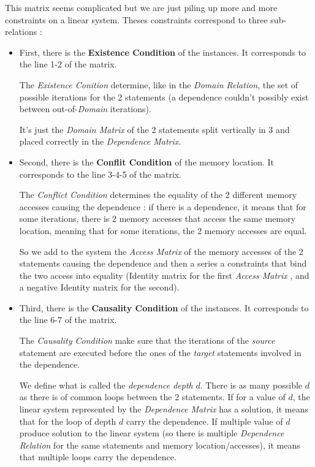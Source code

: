 \documentclass[paper=a4, fontsize=11pt]{scrartcl}
\numberwithin{equation}{section}        %
\numberwithin{figure}{section}          %
\numberwithin{table}{section}               %
\begin{document}
        This matrix seems complicated but we are just piling up more and more constraints
        on a linear system. Theses constraints correspond to three sub-relations :
        \begin{itemize}
            \item First, there is the \textbf{Existence Condition} of the instances.
                It corresponds to the line 1-2 of the matrix.

                The \textit{Existence Conition} determine, like in the \textit{Domain Relation},
                the set of possible iterations for the 2 statements (a dependence couldn't
                possibly exist between out-of-\textit{Domain} iterations).

                It's just the \textit{Domain Matrix} of the 2 statements split vertically
                in 3 and placed correctly in the \textit{Dependence Matrix}.
            \item Second, there is the \textbf{Conflit Condition} of the memory location.
                It corresponds to the line 3-4-5 of the matrix.

                The \textit{Conflict Condition} determines the equality of the 2 different 
                memory accesses causing the dependence : if there is a dependence,
                it means that for some iterations, there is 2 memory accesses that 
                access the same memory location, meaning that for some iterations,
                the 2 memory accesses are equal.

                So we add to the system the \textit{Access Matrix} of the memory accesses of the 2
                statements causing the dependence and then a series a constraints
                that bind the two access into equality (Identity matrix for the first
                \textit{Access Matrix} , and a negative Identity matrix for the second).
            \item Third, there is the \textbf{Causality Condition} of the instances.
                It corresponds to the line 6-7 of the matrix.

                The \textit{Causality Condition} make sure that the iterations of the
                \textit{source} statement are executed before the ones of the \textit{target} statements
                involved in the dependence.

                We define what is called the \textit{dependence depth} $d$. There is
                as many possible $d$ as there is of common loops between the 2 statements.
                If for a value of $d$, the linear system represented by the \textit{Dependence Matrix}
                has a solution, it means that for the loop of depth $d$ carry the dependence.
                If multiple value of $d$ produce solution to the linear system (so there
                is multiple \textit{Dependence Relation} for the same statements and
                memory location/accesses), it means that multiple loops carry the dependence.


\end{itemize}
\end{document}
